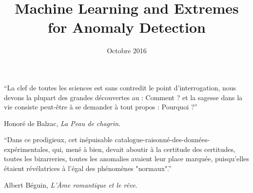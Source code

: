 \documentclass{ecsthesis}      %
\begin{document}
\sloppy

\begingroup
  \makeatletter
  \let\BR@bibitem\BRatbibitem
  \nobibliography*
\endgroup
\frontmatter
\title      {Machine Learning and Extremes for Anomaly Detection}
\date       {Octobre 2016}
\subject    {PhD Thesis}
\maketitle

%
\tableofcontents
\listoffigures
\listoftables

\thispagestyle{plain}

\null\vfill

``La clef de toutes les sciences est sans contredit le point d'interrogation, nous devons la plupart des grandes découvertes au : Comment ? et la sagesse dans la vie consiste peut-être à se demander à tout propos : Pourquoi ?''

\begin{flushright}
Honoré de Balzac, \emph{La Peau de chagrin}. 
\end{flushright}

\vspace*{1cm}

``Dans ce prodigieux, cet inépuisable catalogue-raisonné-des-données-expérimentales, qui, mené à bien, devait aboutir à la certitude des certitudes, toutes les bizarreries, toutes les anomalies avaient leur place marquée, puisqu'elles étaient révélatrices à l'égal des phénomènes "normaux".''

\begin{flushright}
Albert Béguin, \emph{L'Âme romantique et le rêve}.
\end{flushright}




\end{document}
